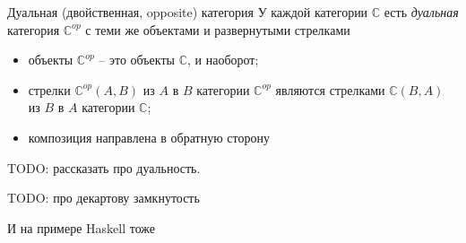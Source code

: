 \documentclass[
  russian,
  aspectratio=169,
  xcolor={svgnames},
  hyperref={colorlinks,citecolor=DeepPink4}]{beamer}
\begin{document}
\begin{frame}[fragile]{Дуальная (двойственная, opposite) категория}
У каждой категории $\mathbb{C}$ есть \emph{дуальная} категория $\mathbb{C}^{op}$ с теми же объектами и развернутыми стрелками
\begin{itemize}
 \item объекты $\mathbb{C}^{op}$ -- это объекты $\mathbb{C}$, и наоборот;
 \item стрелки $\mathbb{C}^{op}(A,B)$ из $A$ в $B$ категории $\mathbb{C}^{op}$
 являются стрелками $\mathbb{C}(B,A)$ из $B$ в $A$ категории $\mathbb{C}$;
 \item композиция направлена в обратную сторону
\end{itemize}

\vspace{1cm}

TODO: рассказать про дуальность.
\end{frame}
%
%

\begin{frame}[fragile]{TODO: про декартову замкнутость}

 И на примере Haskell тоже

\end{frame}
\end{document}
